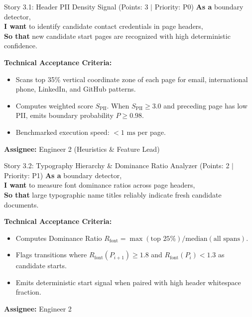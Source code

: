 \documentclass[11pt,a4paper]{article}
\begin{document}
\begin{storybox}{Story 3.1: Header PII Density Signal (Points: 3 $|$ Priority: P0)}
\textbf{As a} boundary detector, \\
\textbf{I want} to identify candidate contact credentials in page headers, \\
\textbf{So that} new candidate start pages are recognized with high deterministic confidence.

\vspace{0.3em}
\textbf{Technical Acceptance Criteria:}
\begin{itemize}[leftmargin=1.2em, itemsep=1pt]
    \item Scans top 35\% vertical coordinate zone of each page for email, international phone, LinkedIn, and GitHub patterns.
    \item Computes weighted score $S_{\text{PII}}$. When $S_{\text{PII}} \ge 3.0$ and preceding page has low PII, emits boundary probability $P \ge 0.98$.
    \item Benchmarked execution speed: $<1\text{ ms}$ per page.
\end{itemize}
\textbf{Assignee:} Engineer 2 (Heuristics \& Feature Lead)
\end{storybox}

\begin{storybox}{Story 3.2: Typography Hierarchy \& Dominance Ratio Analyzer (Points: 2 $|$ Priority: P1)}
\textbf{As a} boundary detector, \\
\textbf{I want} to measure font dominance ratios across page headers, \\
\textbf{So that} large typographic name titles reliably indicate fresh candidate documents.

\vspace{0.3em}
\textbf{Technical Acceptance Criteria:}
\begin{itemize}[leftmargin=1.2em, itemsep=1pt]
    \item Computes Dominance Ratio $R_{\text{font}} = \max(\text{top } 25\%) / \text{median}(\text{all spans})$.
    \item Flags transitions where $R_{\text{font}}(P_{i+1}) \ge 1.8$ and $R_{\text{font}}(P_i) < 1.3$ as candidate starts.
    \item Emits deterministic start signal when paired with high header whitespace fraction.
\end{itemize}
\textbf{Assignee:} Engineer 2
\end{storybox}

\clearpage
\end{document}
